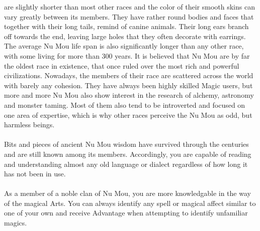 %
 are slightly shorter than most other races and the color of their smooth skins can vary greatly between its members.
They have rather round bodies and faces that together with their long tails, remind of canine animals.
Their long ears branch off towards the end, leaving large holes that they often decorate with earrings.
The average Nu Mou life span is also significantly longer than any other race, with some living for more than 300 years.
It is believed that Nu Mou are by far the oldest race in existence, that once ruled over the most rich and powerful civilizations.
Nowadays, the members of their race are scattered across the world with barely any cohesion.
They have always been highly skilled Magic users, but more and more Nu Mou also show interest in the research of alchemy, astronomy and monster taming.
Most of them also tend to be introverted and focused on one area of expertise, which is why other races perceive the Nu Mou as odd, but harmless beings.   
%
\\\\
%
  Bits and pieces of ancient Nu Mou wisdom have survived through the centuries and are still known among its members.
Accordingly, you are capable of reading and understanding almost any old language or dialect regardless of how long it has not been in use.
%
\\\\
%
 As a member of a noble clan of Nu Mou, you are more knowledgable in the way of the magical Arts. You can always identify any spell or magical affect similar to one of your own and receive Advantage when attempting to identify unfamiliar magics.
%
\clearpage
%
%
